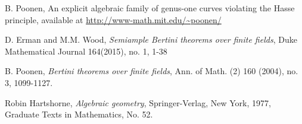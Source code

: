 \documentclass[12pt]{article}
\theoremstyle{plain}
\theoremstyle{definition}
\newcommand{\<}{\langle}
\renewcommand{\>}{\rangle}
\begin{document}
\begin{thebibliography}{9}
B. Poonen, An explicit algebraic family of genus-one curves violating the Hasse principle, available at \url{http://www-math.mit.edu/~poonen/}

D. Erman and M.M. Wood, \textit{Semiample Bertini theorems over finite fields}, Duke Mathematical Journal 164(2015), no. 1, 1-38

B. Poonen, \textit{Bertini theorems over finite fields}, Ann. of Math. (2) 160 (2004), no. 3, 1099-1127.

Robin Hartshorne, \textit{Algebraic geometry}, Springer-Verlag, New York, 1977, Graduate Texts in
Mathematics, No. 52.




\end{thebibliography}
\end{document}
